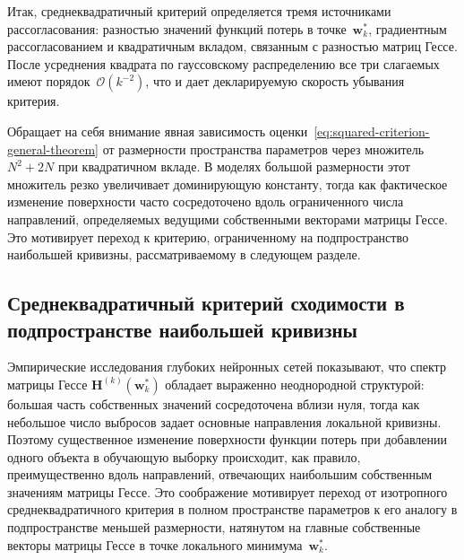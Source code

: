 Итак, среднеквадратичный критерий определяется тремя источниками рассогласования: разностью значений функций потерь в точке~$\mathbf w_k^*$, градиентным рассогласованием и квадратичным вкладом, связанным с разностью матриц Гессе. После усреднения квадрата по гауссовскому распределению все три слагаемых имеют порядок~$\mathcal O(k^{-2})$, что и дает декларируемую скорость убывания критерия.

Обращает на себя внимание явная зависимость оценки~\eqref{eq:squared-criterion-general-theorem} от размерности пространства параметров через множитель $N^2+2N$ при квадратичном вкладе. В моделях большой размерности этот множитель резко увеличивает доминирующую константу, тогда как фактическое изменение поверхности часто сосредоточено вдоль ограниченного числа направлений, определяемых ведущими собственными векторами матрицы Гессе. Это мотивирует переход к критерию, ограниченному на подпространство наибольшей кривизны, рассматриваемому в следующем разделе.

\subsection{Среднеквадратичный критерий сходимости в подпространстве наибольшей кривизны}\label{subsec:subspace}

Эмпирические исследования глубоких нейронных сетей показывают, что спектр матрицы Гессе $\mathbf H^{(k)}(\mathbf w_k^*)$ обладает выраженно неоднородной структурой: большая часть собственных значений сосредоточена вблизи нуля, тогда как небольшое число выбросов задает основные направления локальной кривизны. Поэтому существенное изменение поверхности функции потерь при добавлении одного объекта в обучающую выборку происходит, как правило, преимущественно вдоль направлений, отвечающих наибольшим собственным значениям матрицы Гессе. Это соображение мотивирует переход от изотропного среднеквадратичного критерия в полном пространстве параметров к его аналогу в подпространстве меньшей размерности, натянутом на главные собственные векторы матрицы Гессе в точке локального минимума~$\mathbf w_k^*$.

